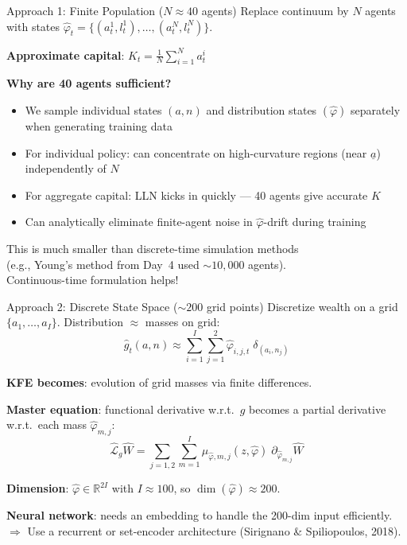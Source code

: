 \documentclass[aspectratio=169,11pt]{beamer}
\newcommand{\emphc}[1]{\textcolor{harvardcrimson}{#1}}
\newcommand{\R}{\mathbb{R}}
\newcommand{\ubar}[1]{\underline{#1}}
\begin{document}
\begin{frame}{Approach 1: Finite Population ($N \approx 40$ agents)}
\small
Replace continuum by $N$ agents with states $\hat{\varphi}_t = \{(a_t^1, l_t^1), \ldots, (a_t^N, l_t^N)\}$.

\vspace{0.2em}
\textbf{Approximate capital}: $K_t = \frac{1}{N}\sum_{i=1}^N a_t^i$

\vspace{0.2em}
\textbf{Why are 40 agents sufficient?}
\begin{itemize}\itemsep2pt
    \item We sample individual states $(a,n)$ and distribution states $(\hat{\varphi})$ \emphc{separately} when generating training data
    \item For individual policy: can concentrate on high-curvature regions (near $\ubar{a}$) independently of $N$
    \item For aggregate capital: LLN kicks in quickly --- 40 agents give accurate $K$
    \item Can analytically eliminate finite-agent noise in $\hat{\varphi}$-drift during training
\end{itemize}

\vspace{0.2em}
\begin{center}
\colorbox{uzhgreylight}{\parbox{0.7\textwidth}{\centering\small
This is much smaller than discrete-time simulation methods\\
(e.g., Young's method from Day~4 used $\sim 10{,}000$ agents).\\
Continuous-time formulation helps!}}
\end{center}
\end{frame}

\begin{frame}{Approach 2: Discrete State Space ($\sim 200$ grid points)}
\small
Discretize wealth on a grid $\{a_1, \ldots, a_I\}$. Distribution $\approx$ masses on grid:
\[
\hat{g}_t(a,n) \approx \sum_{i=1}^{I}\sum_{j=1}^{2} \hat{\varphi}_{i,j,t}\;\delta_{(a_i, n_j)}
\]

\vspace{0.1em}
\textbf{KFE becomes}: evolution of grid masses via \emphc{finite differences}.

\vspace{0.2em}
\textbf{Master equation}: functional derivative w.r.t.\ $g$ becomes a \emphc{partial derivative} w.r.t.\ each mass $\hat{\varphi}_{m,j}$:
\[
\hat{\mathcal{L}}_g \hat{W} = \sum_{j=1,2}\sum_{m=1}^{I} \mu_{\hat{\varphi},m,j}(z, \hat{\varphi})\;\partial_{\hat{\varphi}_{m,j}}\hat{W}
\]

\vspace{0.1em}
\textbf{Dimension}: $\hat{\varphi} \in \R^{2I}$ with $I \approx 100$, so $\dim(\hat{\varphi}) \approx 200$.

\vspace{0.2em}
\textbf{Neural network}: needs an \emphc{embedding} to handle the 200-dim input efficiently.\\
$\Rightarrow$ Use a recurrent or set-encoder architecture (Sirignano \& Spiliopoulos, 2018).
\end{frame}
\end{document}
